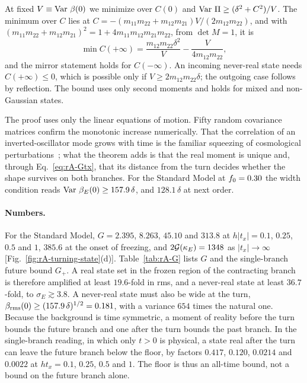 \begin{rAproof}
\begin{equation}
\end{equation}
At fixed $V\equiv\operatorname{Var}\,\beta(0)$ we minimize over $C(0)$ and $\operatorname{Var}\,\Pi\geq(\delta^2+C^2)/V$.
The minimum over $C$ lies at $C=-(m_{11}m_{22}+m_{12}m_{21})V/(2m_{12}m_{22})$, and with $(m_{11}m_{22}+m_{12}m_{21})^2=1+4m_{11}m_{12}m_{21}m_{22}$, from $\det M=1$, it is
\begin{equation}
\min C(+\infty)=\frac{m_{12}m_{22}\delta^2}{V}-\frac{V}{4m_{12}m_{22}} ,
\end{equation}
and the mirror statement holds for $C(-\infty)$.
An incoming never-real state needs $C(+\infty)\leq0$, which is possible only if $V\geq2m_{12}m_{22}\delta$; the outgoing case follows by reflection.
The bound uses only second moments and holds for mixed and non-Gaussian states.
\end{rAproof}

The proof uses only the linear equations of motion.
Fifty random covariance matrices confirm the monotonic increase numerically. %
That the correlation of an inverted-oscillator mode grows with time is the familiar squeezing of cosmological perturbations~\cite{Polarski:1995jg}; what the theorem adds is that the real moment is unique and, through Eq.~\eqref{eq:rA-Gtx}, that its distance from the turn decides whether the shape survives on both branches.
For the Standard Model at $f_0=0.30$ the width condition reads $\operatorname{Var}\,\beta_E(0)\geq157.9\,\delta$, and $128.1\,\delta$ at next order. %

\paragraph{Numbers.}
For the Standard Model, $G=2.395$, $8.263$, $45.10$ and $313.8$ at $h|t_x|=0.1$, $0.25$, $0.5$ and $1$, $385.6$ at the onset of freezing, and $2\mathcal{G}(\kappa_E)=1348$ as $|t_x|\to\infty$ [Fig.~\ref{fig:rA-turning-state}(d)]. %
Table~\ref{tab:rA-G} lists $G$ and the single-branch future bound $G_+$.
A real state set in the frozen region of the contracting branch is therefore amplified at least $19.6$-fold in rms, and a never-real state at least $36.7$-fold, to $\sigma_E\gtrsim3.8$. %
A never-real state must also be wide at the turn, $\beta_{\rm rms}(0)\geq(157.9\,\delta)^{1/2}=0.181$, with a variance $654$ times the natural one. %
Because the background is time symmetric, a moment of reality before the turn bounds the future branch and one after the turn bounds the past branch.
In the single-branch reading, in which only $t>0$ is physical, a state real after the turn can leave the future branch below the floor, by factors $0.417$, $0.120$, $0.0214$ and $0.0022$ at $ht_x=0.1$, $0.25$, $0.5$ and $1$. %
The floor is thus an all-time bound, not a bound on the future branch alone.

